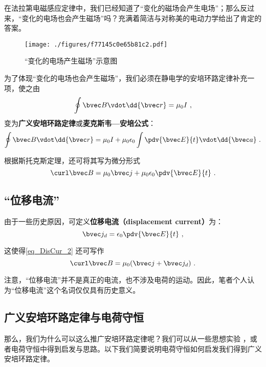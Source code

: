 
\begin{issues}
\issueDraft
\end{issues}


在法拉第电磁感应定律中，我们已经知道了“变化的磁场会产生电场”；那么反过来，“变化的电场也会产生磁场”吗？充满着简洁与对称美的电动力学给出了肯定的答案。

\begin{figure}[ht]
\centering
\texttt{[image: ./figures/f77145c0e65b81c2.pdf]}
\caption{“变化的电场产生磁场”示意图} \label{fig_DisCur_1}
\end{figure}

为了体现“变化的电场也会产生磁场”，我们必须在静电学的安培环路定律补充一项，使之由
\begin{equation}
\oint \bvec B \vdot \dd{\bvec r} = \mu_0 I~,
\end{equation}
变为\textbf{广义安培环路定律}或\textbf{麦克斯韦—安培公式}：
\begin{equation}
\oint \bvec B \vdot \dd{\bvec r} = \mu_0 I + \mu_0 \epsilon_0 \int \pdv{\bvec E}{t} \vdot \dd{\bvec a}~.
\end{equation}

根据斯托克斯定理，还可将其写为微分形式
\begin{equation}\label{eq_DisCur_2}
\curl \bvec B = \mu_0 \bvec j + \mu_0\epsilon_0 \pdv{\bvec E}{t}~.
\end{equation}

\subsection{“位移电流”}
由于一些历史原因，可定义\textbf{位移电流（displacement current）}为：
\begin{equation}
\bvec j_d = \epsilon_0 \pdv{\bvec E}{t}~,
\end{equation}

这使得\autoref{eq_DisCur_2} 还可写作
\begin{equation}
\curl \bvec B = \mu_0 (\bvec j + \bvec j_d)~.
\end{equation}

注意，“位移电流”并不是真正的电流，也不涉及电荷的运动。因此，笔者个人认为“位移电流”这个名词仅仅具有历史意义。

\subsection{广义安培环路定律与电荷守恒}
那么，我们为什么可以这么推广安培环路定律呢？我们可以从一些思想实验
，或者电荷守恒中得到启发与思路。以下我们简要说明电荷守恒如何启发我们得到广义安培环路定律。

